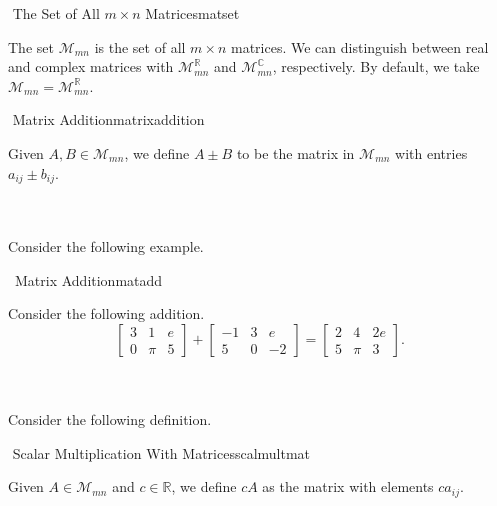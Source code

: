         \begin{definition}{\Stop\,\,The Set of All \(m\times n\) Matrices}{matset}
        
            The set \(\mathcal{M}_{mn}\) is the set of all \(m\times n\) matrices. We can distinguish between real and complex matrices with \(\mathcal{M}_{mn}^\mathbb{R}\) and \(\mathcal{M}_{mn}^\mathbb{C}\), respectively. By default, we take \(\mathcal{M}_{mn}=\mathcal{M}_{mn}^\mathbb{R}\). 
            
        \end{definition}
        \begin{definition}{\Stop\,\,Matrix Addition}{matrixaddition}
        
            Given \(A,B\in\mathcal{M}_{mn}\), we define \(A\pm B\) to be the matrix in \(\mathcal{M}_{mn}\) with entries \(a_{ij}\pm b_{ij}\).
        
        \end{definition}
        \vphantom
        \\
        \\
        Consider the following example.
        \begin{example}{\Difficulty\,\Difficulty\,\,Matrix Addition}{matadd}
        
            Consider the following addition.
            \begin{equation*}
                \begin{bmatrix} 3 & 1 & e \\ 0 & \pi & 5 \end{bmatrix}+\begin{bmatrix} -1 & 3 & e \\ 5 & 0 & -2 \end{bmatrix}=\begin{bmatrix} 2 & 4 & 2e \\ 5 & \pi & 3 \end{bmatrix}.
            \end{equation*}
        
        \end{example}
        \vphantom
        \\
        \\
        Consider the following definition.
        \begin{definition}{\Stop\,\,Scalar Multiplication With Matrices}{scalmultmat}
        
            Given \(A\in\mathcal{M}_{mn}\) and \(c\in\mathbb{R}\), we define \(cA\) as the matrix with elements \(ca_{ij}\).
        
        \end{definition}
